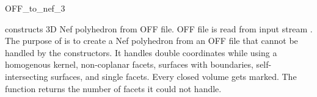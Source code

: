 
\begin{ccRefFunction}{OFF_to_nef_3}

 {constructs 3D
Nef polyhedron from OFF file. OFF file is read from input stream
. The purpose of  is to create
a Nef polyhedron from an OFF file that cannot be handled by the
 constructors. It handles double coordinates
while using a homogenous kernel, non-coplanar facets, surfaces with
boundaries, self-intersecting surfaces, and single facets. Every
closed volume gets marked. The function returns the number of facets
it could not handle.}

\ccSeeAlso
{}\\ 

\end{ccRefFunction}
